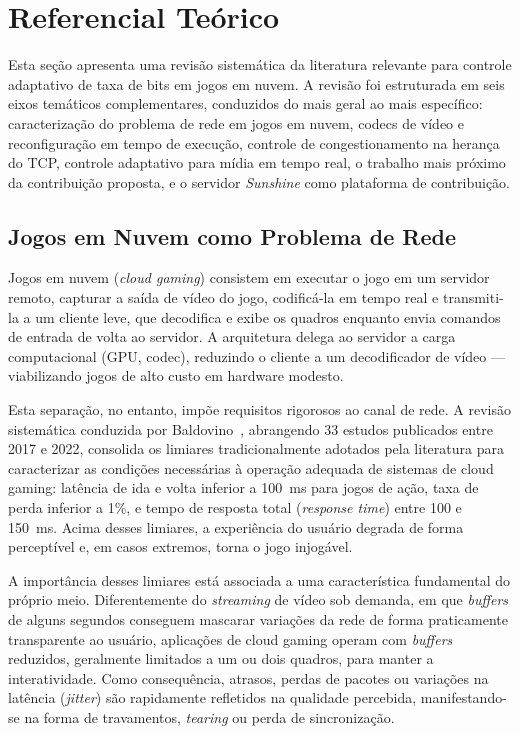 
\section{Referencial Teórico}\label{sec:referencial}

Esta seção apresenta uma revisão sistemática da literatura
relevante para controle adaptativo de taxa de bits em jogos em
nuvem. A revisão foi estruturada em seis eixos temáticos
complementares, conduzidos do mais geral ao mais específico:
caracterização do problema de rede em jogos em nuvem, codecs de
vídeo e reconfiguração em tempo de execução, controle de
congestionamento na herança do TCP, controle adaptativo para
mídia em tempo real, o trabalho mais próximo da contribuição
proposta, e o servidor \emph{Sunshine} como plataforma de
contribuição.

\subsection{Jogos em Nuvem como Problema de Rede}

Jogos em nuvem (\emph{cloud gaming}) consistem em executar o
jogo em um servidor remoto, capturar a saída de vídeo do jogo,
codificá-la em tempo real e transmiti-la a um cliente leve, que
decodifica e exibe os quadros enquanto envia comandos de entrada
de volta ao servidor. A arquitetura delega ao
servidor a carga computacional (GPU, codec), reduzindo o cliente
a um decodificador de vídeo — viabilizando jogos de alto custo
em hardware modesto.

Esta separação, no entanto, impõe requisitos rigorosos ao canal de rede. A revisão sistemática conduzida por Baldovino~\cite{baldovino2022}, abrangendo 33 estudos publicados entre 2017 e 2022, consolida os limiares tradicionalmente adotados pela literatura para caracterizar as condições necessárias à operação adequada de sistemas de cloud gaming: latência de ida e volta inferior
a \SI{100}{\milli\second} para jogos de ação, taxa de perda
inferior a 1\%, e tempo de resposta total (\emph{response time})
entre 100 e \SI{150}{\milli\second}. Acima desses limiares, a
experiência do usuário degrada de forma perceptível e, em casos
extremos, torna o jogo injogável.

A importância desses limiares está associada a uma característica fundamental do próprio meio. Diferentemente do \emph{streaming} de vídeo sob demanda, em que \emph{buffers} de alguns segundos conseguem mascarar variações da rede de forma praticamente transparente ao usuário, aplicações de cloud gaming operam com \emph{buffers} reduzidos, geralmente limitados a um ou dois quadros, para manter a interatividade. Como consequência, atrasos, perdas de pacotes ou variações na latência (\emph{jitter}) são rapidamente refletidos na qualidade percebida, manifestando-se na forma de travamentos, \emph{tearing} ou perda de sincronização.

